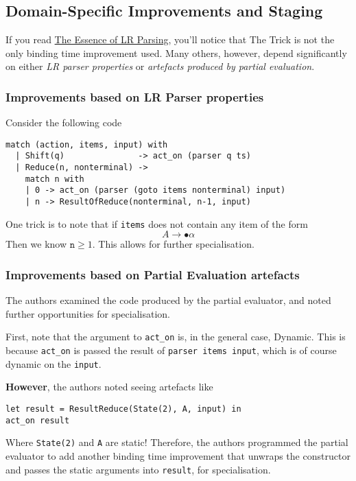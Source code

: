 \subsection{Domain-Specific Improvements and Staging}
If you read \href{https://dl.acm.org/doi/pdf/10.1145/215465.215579}{The Essence of LR Parsing}, you'll notice that The Trick is not the only binding time improvement used. Many others, however, depend significantly on either \textit{LR parser properties} or \textit{artefacts produced by partial evaluation}.

\subsubsection{Improvements based on LR Parser properties}
Consider the following code 
\begin{verbatim}
match (action, items, input) with
  | Shift(q)               -> act_on (parser q ts) 
  | Reduce(n, nonterminal) -> 
    match n with 
    | 0 -> act_on (parser (goto items nonterminal) input)
    | n -> ResultOfReduce(nonterminal, n-1, input)
\end{verbatim}
One trick is to note that if \texttt{items} does not contain any item of the form 
\[A \to \bullet \alpha \]
Then we know $\texttt{n} \geq 1$. This allows for further specialisation. 

\subsubsection{Improvements based on Partial Evaluation artefacts}
The authors examined the code produced by the partial evaluator, and noted further opportunities for specialisation. 

First, note that the argument to \texttt{act\_on} is, in the general case, \textsf{Dynamic}. This is because \texttt{act\_on} is passed the result of \texttt{parser items input}, which is of course dynamic on the \texttt{input}. 

\textbf{However}, the authors noted seeing artefacts like
\begin{verbatim}
let result = ResultReduce(State(2), A, input) in
act_on result
\end{verbatim}

Where \texttt{State(2)} and \texttt{A} are static! Therefore, the authors programmed the partial evaluator to add another binding time improvement that unwraps the constructor and passes the static arguments into \texttt{result}, for specialisation.

